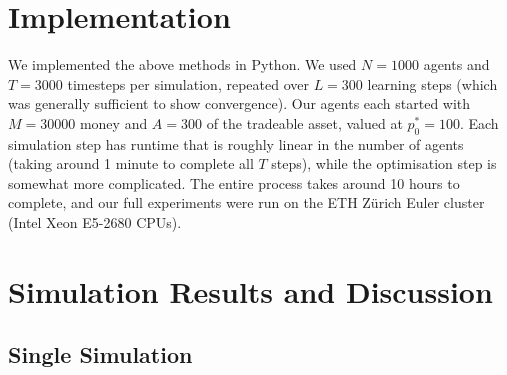 \documentclass[11pt]{article}
\begin{document}
\section{Implementation}

We implemented the above methods in Python. We used $N=1000$ agents and $T=3000$ timesteps per simulation, repeated over $L=300$ learning steps (which was generally sufficient to show convergence). Our agents each started with $M=30000$ money and $A=300$ of the tradeable asset, valued at $p_0^*=100$. Each simulation step has runtime that is roughly linear in the number of agents (taking around 1 minute to complete all $T$ steps), while the optimisation step is somewhat more complicated. The entire process takes around 10 hours to complete, and our full experiments were run on the ETH Z\"urich Euler cluster (Intel Xeon E5-2680 CPUs).

\section{Simulation Results and Discussion}

\subsection{Single Simulation}
\end{document}
